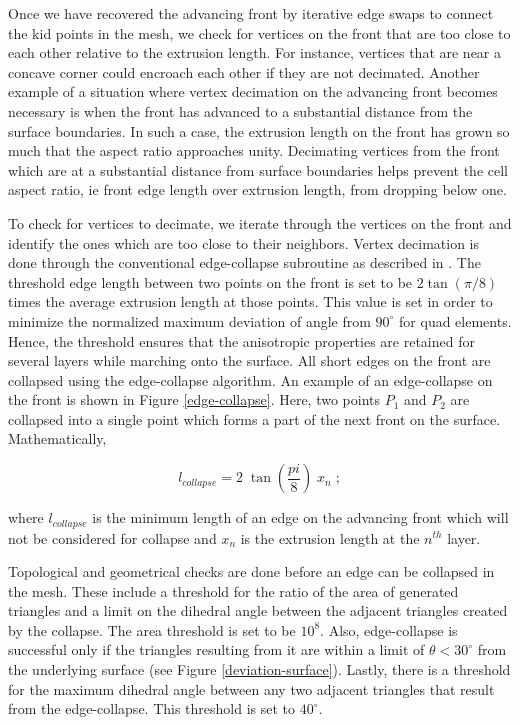 Once we have recovered the advancing front by iterative edge swaps to connect the kid points in the mesh, we check for vertices on the front that are too close to each other relative to the extrusion length. For instance, vertices that are near a concave corner could encroach each other if they are not decimated. Another example of a situation where vertex decimation on the advancing front becomes necessary is when the front has advanced to a substantial distance from the surface boundaries. In such a case, the extrusion length on the front has grown so much that the aspect ratio approaches unity. Decimating vertices from the front which are at a substantial distance from surface boundaries helps prevent the cell aspect ratio, ie front edge length over extrusion length, from dropping below one.

To check for vertices to decimate, we iterate through the vertices on the front and identify the ones which are too close to their neighbors. Vertex decimation is done through the conventional edge-collapse subroutine as described in \cite{hoppe1994mesh}. The threshold edge length between two points on the front is set to be $2 \tan(\pi/8)$ times the average extrusion length at those points. This value is set in order to minimize the normalized maximum deviation of angle from $90^\circ$ for quad elements. Hence, the threshold ensures that the anisotropic properties are retained for several layers while marching onto the surface. All short edges on the front are collapsed using the edge-collapse algorithm. An example of an edge-collapse on the front is shown in Figure \ref{edge-collapse}. Here, two points $P_1$ and $P_2$ are collapsed into a single point which forms a part of the next front on the surface. Mathematically,

\begin{equation}
l_{\mathit{collapse}} = 2 \; \tan \left( \frac{pi}{8} \right) \; x_n \; ;
\end{equation}

where $l_{\mathit{collapse}}$ is the minimum length of an edge on the advancing front which will not be considered for collapse and $x_n$ is the extrusion length at the $n^{th}$ layer.


Topological and geometrical checks are done before an edge can be collapsed in the mesh. These include a threshold for the ratio of the area of generated triangles and a limit on the dihedral angle between the adjacent triangles created by the collapse. The area threshold is set to be $10^8$. Also, edge-collapse is successful only if the triangles resulting from it are within a limit of $\theta < 30^{\circ}$ from the underlying surface (see Figure \ref{deviation-surface}). Lastly, there is a threshold for the maximum dihedral angle between any two adjacent triangles that result from the edge-collapse. This threshold is set to $40^{\circ}$. 

